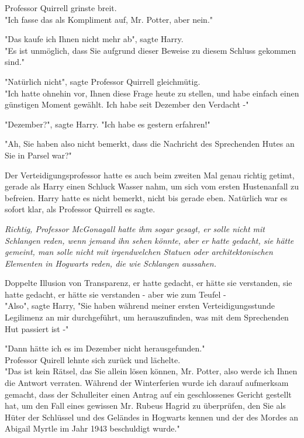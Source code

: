 {Professor Quirrell grinste breit.\\ "Ich fasse das als Kompliment auf, Mr. Potter, aber nein."

"Das kaufe ich Ihnen nicht mehr ab", sagte Harry.\\ "Es ist unmöglich, dass Sie aufgrund dieser Beweise zu diesem Schluss gekommen sind."

"Natürlich nicht", sagte Professor Quirrell gleichmütig.\\ "Ich hatte ohnehin vor, Ihnen diese Frage heute zu stellen, und habe einfach einen günstigen Moment gewählt. Ich habe seit Dezember den Verdacht -"

"Dezember?", sagte Harry. "Ich habe es gestern erfahren!"

"Ah, Sie haben also nicht bemerkt, dass die Nachricht des Sprechenden Hutes an Sie in Parsel war?"

Der Verteidigungsprofessor hatte es auch beim zweiten Mal genau richtig getimt, gerade als Harry einen Schluck Wasser nahm, um sich vom ersten Hustenanfall zu befreien. Harry hatte es nicht bemerkt, nicht bis gerade eben. Natürlich war es sofort klar, als Professor Quirrell es sagte.

\emph{Richtig, Professor McGonagall hatte ihm sogar gesagt, er solle nicht mit Schlangen reden, wenn jemand ihn sehen könnte, aber er hatte gedacht, sie hätte gemeint, man solle nicht mit irgendwelchen Statuen oder architektonischen Elementen in Hogwarts reden, die wie Schlangen aussahen.}

Doppelte Illusion von Transparenz, er hatte gedacht, er hätte sie verstanden, sie hatte gedacht, er hätte sie verstanden - aber wie zum Teufel -\\ "Also", sagte Harry, "Sie haben während meiner ersten Verteidigungsstunde Legilimenz an mir durchgeführt, um herauszufinden, was mit dem Sprechenden Hut passiert ist -"

"Dann hätte ich es im Dezember nicht herausgefunden."\\ Professor Quirell lehnte sich zurück und lächelte.\\ "Das ist kein Rätsel, das Sie allein lösen können, Mr. Potter, also werde ich Ihnen die Antwort verraten. Während der Winterferien wurde ich darauf aufmerksam gemacht, dass der Schulleiter einen Antrag auf ein geschlossenes Gericht gestellt hat, um den Fall eines gewissen Mr. Rubeus Hagrid zu überprüfen, den Sie als Hüter der Schlüssel und des Geländes in Hogwarts kennen und der des Mordes an Abigail Myrtle im Jahr 1943 beschuldigt wurde."

}
